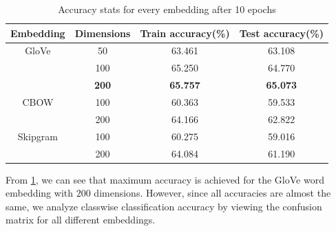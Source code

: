 \documentclass{article}
\begin{document}
\begin{table}[ht]
	\caption{Accuracy stats for every embedding after 10 epochs }%
	\centering %
	\begin{tabular}{|c | c | c | c|}%
		\hline\hline      
		Embedding & Dimensions & Train accuracy(\%) & Test accuracy(\%) \\ [0.5ex]
		\hline  
         GloVe  &   50    &             63.461 &              63.108 \\
                &   100   &             65.250 &              64.770 \\
                &   \textbf{200}   &             \textbf{65.757} &              \textbf{65.073} \\
        \hline
         CBOW   &   100   &             60.363 &             59.533 \\
                &   200   &             64.166 &             62.822 \\
        \hline
         Skipgram   &   100   &         60.275 &             59.016 \\
	                &   200   &         64.084 &             61.190 \\ [1ex]
		\hline
	\end{tabular}
	\label{table:testacc}%
\end{table}
From \cref{table:testacc}, we can see that maximum accuracy is achieved for the GloVe word embedding with $200$ dimensions. However, since all accuracies are almost the same, we analyze classwise classification accuracy by viewing the confusion matrix for all different embeddings.
\end{document}
